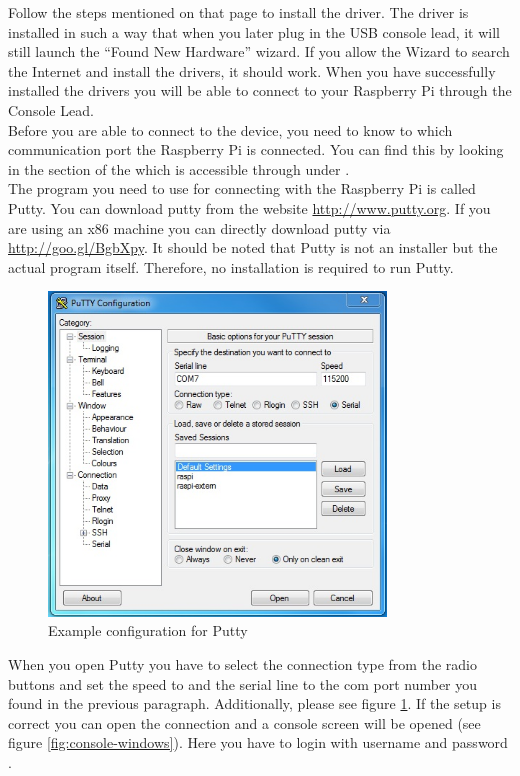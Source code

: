 Follow the steps mentioned on that page to install the driver. The driver is installed in such a way that when you later plug in the USB console lead, it will still launch the ``Found New Hardware'' wizard. If you allow the Wizard to search the Internet and install the drivers, it should work. When you have successfully installed the drivers you will be able to connect to your Raspberry Pi through the Console Lead.\\ 

Before you are able to connect to the device, you need to know to which communication port the Raspberry Pi is connected. You can find this by looking in the  section of the  which is accessible through  under .\\

The program you need to use for connecting with the Raspberry Pi is called Putty. You can download putty from the website \url{http://www.putty.org}. If you are using an x86 machine you can directly download putty via \url{http://goo.gl/BgbXpy}. It should be noted that Putty is not an installer but the actual program itself. Therefore, no installation is required to run Putty.\\
\begin{figure}[!htbp]
	\centering
		\includegraphics[width=0.80\textwidth]{images/putty-config.jpg}
	\caption{Example configuration for Putty}
	\label{fig:putty-config}
\end{figure}

When you open Putty you have to select the connection type  from the radio buttons and set the speed to  and the serial line to the com port number you found in the previous paragraph. Additionally, please see figure \ref{fig:putty-config}. If the setup is correct you can open the connection and a console screen will be opened (see figure \ref{fig:console-windows}). Here you have to login with username  and password .

